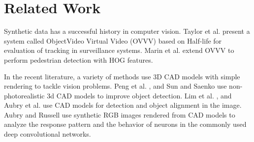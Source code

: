 \section{Related Work}
Synthetic data has a successful history in computer vision. Taylor et al.
present a system called ObjectVideo Virtual Video (OVVV) based on Half-life for evaluation
of tracking in surveillance systems. Marin et al. extend OVVV to perform
pedestrian detection with HOG features. 
 
In the recent literature, a variety of methods use 3D CAD models with simple rendering to tackle vision problems. Peng et al. , and Sun and Saenko use non-photorealistic 3d CAD models to improve object detection. Lim et al. , and Aubry et al. use CAD models for detection and object alignment in the image. Aubry and Russell use synthetic RGB images rendered from CAD models to analyze the response pattern and the behavior of neurons in the commonly used deep convolutional networks.